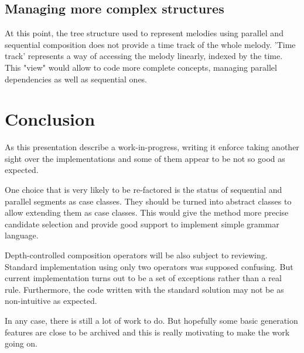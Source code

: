 \documentclass[preprint]{sigplanconf}
\begin{document}
\subsection{Managing more complex structures}

At this point, the tree structure used to represent melodies using parallel and sequential composition does not provide a time track of the whole melody. 'Time track' represents a way of accessing the melody linearly, indexed by the time. This "view" would allow to code more complete concepts, managing parallel dependencies as well as sequential ones.


\section{Conclusion}

As this presentation describe a work-in-progress, writing it enforce taking another sight over the implementations and some of them appear to be not so good as expected.

One choice that is very likely to be re-factored is the status of sequential and parallel segments as case classes. They should be turned into abstract classes to allow extending them as case classes. This would give the \lln{++>} method more precise candidate selection and provide good support to implement simple grammar language.

Depth-controlled composition operators will be also subject to reviewing. Standard implementation using only two operators was supposed confusing. But current implementation turns out to be a set of exceptions rather than a real rule. Furthermore, the code written with the standard solution may not be as non-intuitive as expected.

In any case, there is still a lot of work to do. But hopefully some basic generation features are close to be archived and this is really motivating to make the work going on.






% 




\end{document}
